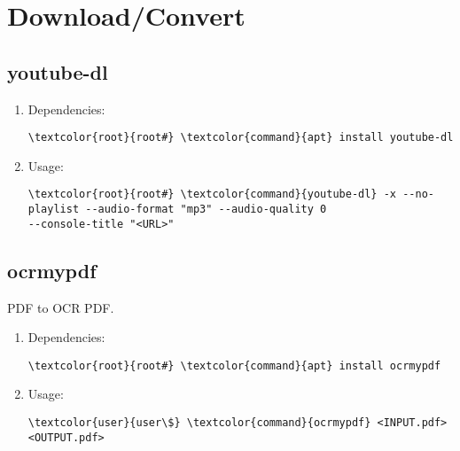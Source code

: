 \documentclass[10pt, a4paper, onecolumn, openany]{book} %
\begin{document}
\section{Download/Convert}
\subsection{youtube-dl}
\begin{enumerate}
    \item Dependencies:
\begin{Verbatim}[commandchars=\\\{\}]
\textcolor{root}{root#} \textcolor{command}{apt} install youtube-dl
\end{Verbatim}
    \item Usage:
\begin{Verbatim}[commandchars=\\\{\}]
\textcolor{root}{root#} \textcolor{command}{youtube-dl} -x --no-playlist --audio-format "mp3" --audio-quality 0 
--console-title "<URL>"
\end{Verbatim}
\end{enumerate}
\subsection{ocrmypdf}
PDF to OCR PDF.
\begin{enumerate}
    \item Dependencies:
\begin{Verbatim}[commandchars=\\\{\}]
\textcolor{root}{root#} \textcolor{command}{apt} install ocrmypdf
\end{Verbatim}
    \item Usage:
\begin{Verbatim}[commandchars=\\\{\}]
\textcolor{user}{user\$} \textcolor{command}{ocrmypdf} <INPUT.pdf> <OUTPUT.pdf>
\end{Verbatim}
\end{enumerate}
\end{document}
